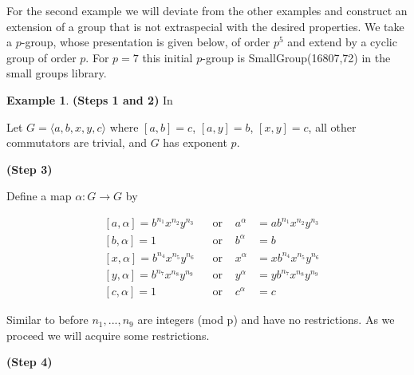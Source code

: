 \documentclass[]{amsart}
\theoremstyle{definition}
\theoremstyle{definition}
\theoremstyle{definition}
\newtheorem{ex}[theorem]{Example}
\theoremstyle{definition}
\theoremstyle{remark}
\theoremstyle{remark}
\begin{document}
        For the second example we will deviate from the other examples and construct an extension of a group that is not extraspecial with the desired properties. We take a $p$-group, whose presentation is given below, of order $p^5$ and extend by a cyclic group of order $p$. For $p=7$ this initial $p$-group is SmallGroup(16807,72) in the small groups library.

        \begin{ex}
            \textbf{(Steps 1 and 2)} 
            In 

            Let $G=\langle a,b,x,y,c\rangle$ where $[a,b]=c$, $[a,y]=b$, $[x,y]=c$, all other commutators are trivial, and $G$ has exponent $p$. 

            \textbf{(Step 3)}
            
            Define a map $\alpha:G\to G$ by 

            \begin{align*}
                &[a,\alpha]=b^{n_1}x^{n_2}y^{n_3} &&\text{or } &a^\alpha&=ab^{n_1}x^{n_2}y^{n_3}\\
                &[b,\alpha]=1 &&\text{or } &b^\alpha&=b\\
                &[x,\alpha]=b^{n_4}x^{n_5}y^{n_6} &&\text{or } &x^\alpha&=xb^{n_4}x^{n_5}y^{n_6}\\
                &[y,\alpha]=b^{n_7}x^{n_8}y^{n_9} &&\text{or } &y^\alpha&=yb^{n_7}x^{n_8}y^{n_9}\\
                &[c,\alpha]=1 &&\text{or } &c^\alpha&=c
            \end{align*}

            Similar to before $n_1,...,n_9$ are integers (mod p) and have no restrictions. As we proceed we will acquire some restrictions.

            \textbf{(Step 4)}


\end{ex}
\end{document}
